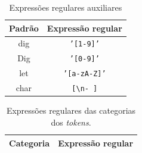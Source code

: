\begin{table}[!h]
    \centering
    \begin{tabular}{ | c | c |}
        \hline
        Padrão & Expressão regular                         \\
        \hline
        dig    & \texttt{'[1-9]'}                          \\
        Dig    & \texttt{'[0-9]'}                          \\
        let    & \texttt{'[a-zA-Z]'}                       \\
        char   & \texttt{[\textbackslash n-~]}
        \hline
    \end{tabular}
    \caption{Expressões regulares auxiliares}
    \label{tab:expressoes-auxiliares}
\end{table}


\begin{center}
    \centering
    \begin{longtable}[c]{ | l | c | }
        \label{tab:expressoes-regulares}
        \caption{Expressões regulares das categorias dos \textit{tokens}.}
        \endfirsthead
        \endhead
        \endfoot
        \endlastfoot
        \hline
        Categoria & Expressão regular\\
        \hline
        
        \hline
    \end{longtable}
\end{center}